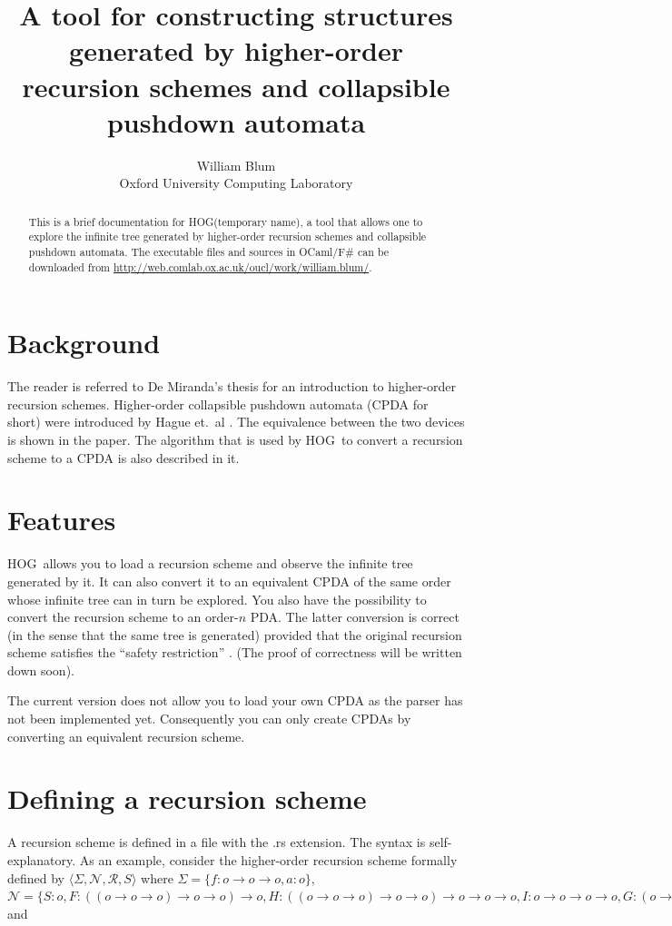 \documentclass{article}
\author{William Blum\\ Oxford University Computing Laboratory}
\title{A tool for constructing structures generated by higher-order recursion schemes and collapsible pushdown automata}
\def\toolname{HOG}
\begin{document}
\maketitle
\begin{abstract}
This is a brief documentation for \toolname (temporary name), a tool that allows one to explore the
infinite tree generated by higher-order recursion schemes and collapsible pushdown automata.
 The executable files and sources in OCaml/F\# can be downloaded from \url{http://web.comlab.ox.ac.uk/oucl/work/william.blum/}.

\end{abstract}

\section{Background}
The reader is referred to De Miranda's thesis \cite{demirandathesis} for an introduction to higher-order recursion schemes. Higher-order collapsible pushdown automata (CPDA for short) were introduced by Hague et.~al \cite{hmos-lics08}. The equivalence between the two devices is shown in the paper.
The algorithm that is used by \toolname\ to convert a recursion scheme to a CPDA is also described in
it.

\section{Features}

\toolname\ allows you to load a recursion scheme and observe the infinite tree generated by it.
It can also convert it to an equivalent CPDA of the same order whose infinite tree can in turn be explored. You also have the possibility to convert the recursion scheme to an order-$n$ PDA. The latter conversion is correct (in the sense that the same tree is generated) provided that the original recursion scheme satisfies the ``safety restriction'' \cite{KNU02}. (The proof of correctness will be written down soon).

The current version does not allow you to load your own CPDA as the parser has not been implemented yet. Consequently you can only create CPDAs by converting an equivalent recursion scheme.


\section{Defining a recursion scheme}
\label{sec:defrecscheme}
A recursion scheme is defined in a file with the .rs extension.
The syntax is self-explanatory. As an example, consider the higher-order recursion scheme formally defined by
$\langle \Sigma, \mathcal{N}, \mathcal{R}, S \rangle $
where $\Sigma = \{f:o\rightarrow o\rightarrow o, a:o \}$, $\mathcal{N} = \{
S: o, F: ((o \rightarrow o \rightarrow o)\rightarrow o\rightarrow o) \rightarrow o, H: ((o \rightarrow o \rightarrow o)\rightarrow o\rightarrow o) \rightarrow o \rightarrow o \rightarrow o, I: o \rightarrow o \rightarrow o \rightarrow o,
    G: (o \rightarrow o \rightarrow o)\rightarrow o\rightarrow o \}$ and
\end{document}

